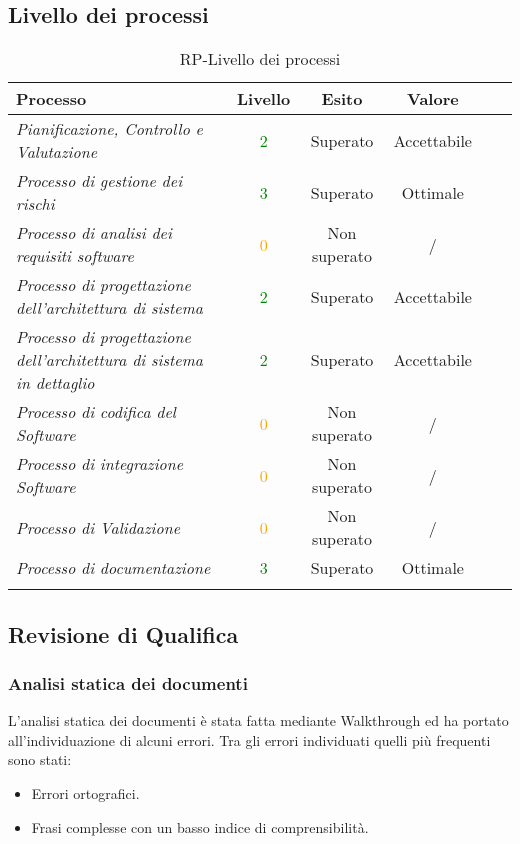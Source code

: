 \subsection{Livello dei processi}
\begin{longtable}{|>{\centering}m{5cm}|c|c|c|c|c|}
\hline
\textbf{Processo} & \textbf{Livello} & \textbf{Esito} & \textbf{Valore}\\
\hline
\endhead
\emph{Pianificazione, Controllo e Valutazione} & \textcolor{Green}{2} & Superato & Accettabile\\ \hline
\emph{Processo di gestione dei rischi} & \textcolor{Green}{3} & Superato & Ottimale\\ \hline
\emph{Processo di analisi dei requisiti software} & \textcolor{Orange}{0} & Non superato & /\\ \hline
\emph{Processo di progettazione dell’architettura di sistema} & \textcolor{Green}{2} & Superato & Accettabile\\ \hline
\emph{Processo di progettazione dell’architettura di sistema in dettaglio} & \textcolor{Green}{2} & Superato & Accettabile\\ \hline
\emph{Processo di codifica del Software} & \textcolor{Orange}{0} & Non superato & /\\ \hline
\emph{Processo di integrazione Software} & \textcolor{Orange}{0} & Non superato & /\\ \hline
\emph{Processo di Validazione} & \textcolor{Orange}{0} & Non superato & /\\ 
\hline
\emph{Processo di documentazione} & \textcolor{Green}{3} & Superato & Ottimale\\ 
\hline
\caption{RP-Livello dei processi}
\end{longtable}

\newpage

\subsection{Revisione di Qualifica}

\subsubsection{Analisi statica dei documenti}
L'analisi statica dei documenti è stata fatta mediante Walkthrough ed ha portato all'individuazione di alcuni errori. Tra gli errori individuati quelli più frequenti sono stati:
		\begin{itemize}
			\item Errori ortografici.
			\item Frasi complesse con un basso indice di comprensibilità.
		\end{itemize}

